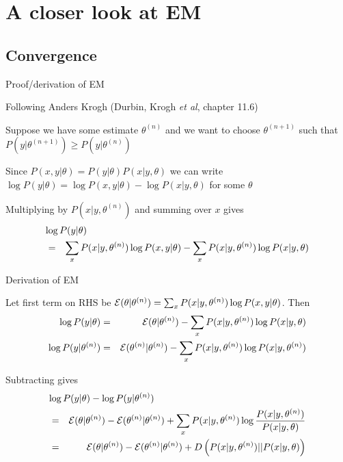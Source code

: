 \documentclass{beamer}
\begin{document}
\section{A closer look at EM}

\subsection{Convergence}

\begin{frame}{Proof/derivation of EM}

 Following Anders Krogh (Durbin, Krogh {\em et al}, chapter 11.6)
  \itemb
  \item Suppose we have some estimate $\theta^{(n)}$ and we want to choose $\theta^{(n+1)}$ such that $P(y|\theta^{(n+1)}) \geq P(y|\theta^{(n)})$
  \item Since $P(x,y|\theta) = P(y|\theta) P(x|y,\theta)$ we can write $\log P(y|\theta) = \log P(x,y|\theta) - \log P(x|y,\theta)$ for some $\theta$
  \item Multiplying by $P(x|y,\theta^{(n)})$ and summing over $x$ gives
\begin{eqnarray*}
\lefteqn{\log P(y|\theta)} \\
& = & \sum_x P(x|y,\theta^{(n)}) \log P(x,y|\theta) - \sum_x P(x|y,\theta^{(n)}) \log P(x|y,\theta)
\end{eqnarray*}
 \iteme

\end{frame}

\begin{frame}{Derivation of EM}

\itemb
  \item Let first term on RHS be ${\cal E}(\theta|\theta^{(n)}) = \sum_x P(x|y,\theta^{(n)}) \log P(x,y|\theta)$. Then
\begin{eqnarray*}
\log P(y|\theta) & = & {\cal E}(\theta|\theta^{(n)}) - \sum_x P(x|y,\theta^{(n)}) \log P(x|y,\theta) \\
\log P(y|\theta^{(n)}) & = & {\cal E}(\theta^{(n)}|\theta^{(n)}) - \sum_x P(x|y,\theta^{(n)}) \log P(x|y,\theta^{(n)})
\end{eqnarray*}
  \item Subtracting gives
\begin{eqnarray*}
\lefteqn{\log P(y|\theta) - \log P(y|\theta^{(n)})} \\
& = & {\cal E}(\theta|\theta^{(n)}) - {\cal E}(\theta^{(n)}|\theta^{(n)}) + \sum_x P(x|y,\theta^{(n)}) \log \frac{P(x|y,\theta^{(n)})}{P(x|y,\theta)} \\
& = & {\cal E}(\theta|\theta^{(n)}) - {\cal E}(\theta^{(n)}|\theta^{(n)}) + D\left(P(x|y,\theta^{(n)}) || P(x|y,\theta)\right)
\end{eqnarray*}
 \iteme

\end{frame}
\end{document}
